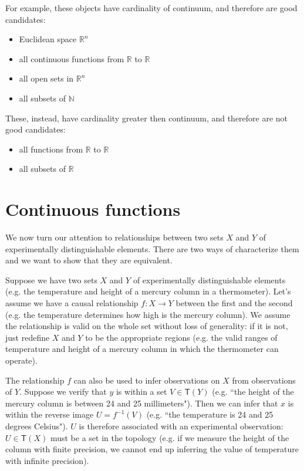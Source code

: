 \documentclass[11pt,letterpaper,fleqn]{memoir} %
\begin{document}
For example, these objects have cardinality of continuum, and therefore are good candidates:
\begin{itemize}
	\item Euclidean space $\mathbb{R}^n$
	\item all continuous functions from $\mathbb{R}$ to $\mathbb{R}$
	\item all open sets in $\mathbb{R}^n$
	\item all subsets of $\mathbb{N}$
\end{itemize}

These, instead, have cardinality greater then continuum, and therefore are not good candidates:
\begin{itemize}
	\item all functions from $\mathbb{R}$ to $\mathbb{R}$
	\item all subsets of $\mathbb{R}$
\end{itemize}


\section{Continuous functions}

We now turn our attention to relationships between two sets $X$ and $Y$ of experimentally distinguishable elements. There are two ways of characterize them and we want to show that they are equivalent.

Suppose we have two sets $X$ and $Y$ of experimentally distinguishable elements (e.g. the temperature and height of a mercury column in a thermometer). Let's assume we have a causal relationship $f: X \rightarrow Y$ between the first and the second (e.g. the temperature determines how high is the mercury column). We assume the relationship is valid on the whole set without loss of generality: if it is not, just redefine $X$ and $Y$ to be the appropriate regions (e.g. the valid ranges of temperature and height of a mercury column in which the thermometer can operate).

The relationship $f$ can also be used to infer observations on $X$ from observations of $Y$. Suppose we verify that $y$ is within a set $V \in \mathsf{T}(Y)$ (e.g. ``the height of the mercury column is between 24 and 25 millimeters"). Then we can infer that $x$ is within the reverse image $U=f^{-1}(V)$ (e.g. ``the temperature is 24 and 25 degrees Celsius"). $U$ is therefore associated with an experimental observation: $U \in \mathsf{T}(X)$ must be a set in the topology (e.g. if we measure the height of the column with finite precision, we cannot end up inferring the value of temperature with infinite precision).
\end{document}
